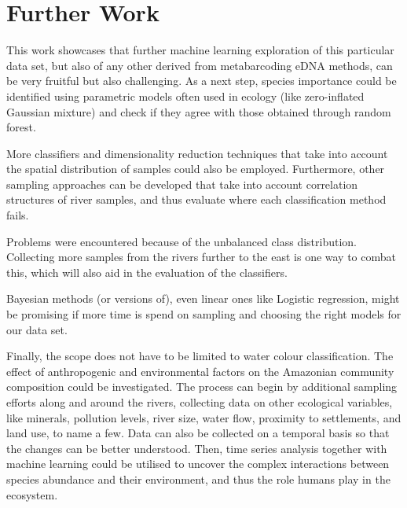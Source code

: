 \section*{Further Work}


This work showcases that further machine learning exploration of this particular data set, but also of any other derived from metabarcoding eDNA methods, can be very fruitful but also challenging. As a next step, species importance could be identified using parametric models often used in ecology (like zero-inflated Gaussian mixture) and check if they agree with those obtained through random forest. 

 More classifiers and dimensionality reduction techniques that take into account the spatial distribution of samples could also be employed. Furthermore, other sampling approaches can be developed that take into account correlation structures of river samples, and thus evaluate where each classification method fails.
 
 Problems were encountered because of the unbalanced class distribution. Collecting more samples from the rivers further to the east is one way to combat this, which will also aid in the evaluation of the classifiers.
 
 Bayesian methods (or versions of), even linear ones like Logistic regression, might be promising if more time is spend on sampling and choosing the right models for our data set. 
 
 Finally, the scope does not have to be limited to water colour classification. The effect of anthropogenic and environmental factors on the Amazonian community composition could be investigated. The process can begin by additional sampling efforts along and around the rivers, collecting data on other ecological variables, like minerals, pollution levels, river size, water flow, proximity to settlements, and land use, to name a few. Data can also be collected on a temporal basis so that the changes can be better understood. Then, time series analysis together with machine learning could be utilised to uncover the complex interactions between species abundance and their environment, and thus the role humans play in the ecosystem.

